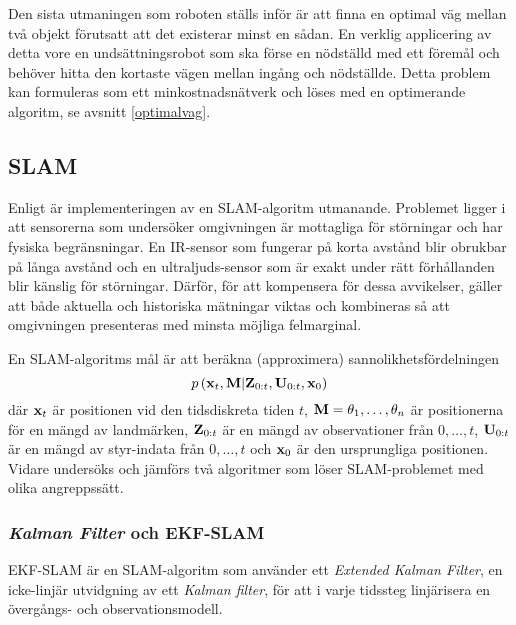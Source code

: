 \documentclass[11pt]{article}
\begin{document}
\begin{flushleft}
Den sista utmaningen som roboten ställs inför är att finna en optimal väg mellan två objekt förutsatt att det existerar minst en sådan. En verklig applicering av detta vore en undsättningsrobot som ska förse en nödställd med ett föremål och behöver hitta den kortaste vägen mellan ingång och nödställde. Detta problem kan formuleras som ett minkostnadsnätverk och löses med en optimerande algoritm, se avsnitt \ref{optimalvag}. 

\subsection{SLAM}
\label{slam}
Enligt \cite{ekf} är implementeringen av en SLAM-algoritm utmanande. Problemet ligger i att sensorerna som undersöker omgivningen är mottagliga för störningar och har fysiska begränsningar. En IR-sensor som fungerar på korta avstånd blir obrukbar på långa avstånd och en ultraljuds-sensor som är exakt under rätt förhållanden blir känslig för störningar. Därför, för att kompensera för dessa avvikelser, gäller att både aktuella och historiska mätningar viktas och kombineras så att omgivningen presenteras med minsta möjliga felmarginal. 

En SLAM-algoritms mål är att beräkna (approximera) sannolikhetsfördelningen
\begin{equation*}
	p\left(\textbf{\textrm{x}}_{t},\textbf{\textrm{M}} \vert \textbf{\textrm{Z}}_{0:t}, \textbf{\textrm{U}}_{0:t}, \textbf{\textrm{x}}_0 \right)
\end{equation*}
där $\textbf{\textrm{x}}_t$ är positionen vid den tidsdiskreta tiden $t$, $\textbf{\textrm{M}}=\theta_1,\ldots,\theta_n$ är positionerna för en mängd av landmärken, $\textbf{\textrm{Z}}_{0:t}$ är en mängd av observationer från $0,\ldots,t$, $\textbf{\textrm{U}}_{0:t}$ är en mängd av styr-indata från $0,\ldots,t$ och $\textbf{\textrm{x}}_0$ är den ursprungliga positionen. Vidare undersöks och jämförs två algoritmer som löser SLAM-problemet med olika angreppssätt.   

\subsubsection{\emph{Kalman Filter} och EKF-SLAM}
EKF-SLAM är en SLAM-algoritm som använder ett \emph{Extended Kalman Filter}, en icke-linjär utvidgning av ett \emph{Kalman filter}, för att i varje tidssteg  linjärisera en övergångs- och observationsmodell.


\end{flushleft}
\end{document}
